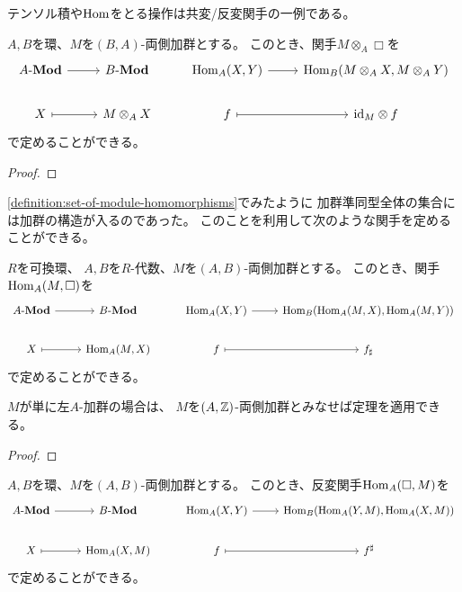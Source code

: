 \documentclass[report]{jlreq}
\begin{document}
テンソル積や$\operatorname{Hom}$をとる操作は共変/反変関手の一例である。

\begin{theorem}[テンソル関手]
    $A, B$を環、$M$を$(B, A)$-両側加群とする。
    このとき、関手$M \otimes_A \Box$を
    \begin{equation}
        \begin{tikzcd}
            \lMod{A} \ar{r}
                & \lMod{B}
                & \Hom_A(X, Y) \ar{r}
                & \Hom_B(M \otimes_A X, M \otimes_A Y) \\
            X \ar[mapsto]{r}
                & M \otimes_A X
                & f \ar[mapsto]{r}
                & \id_M \otimes f
        \end{tikzcd}
    \end{equation}
    で定めることができる。
\end{theorem}

\begin{proof}
    \TODO{}
\end{proof}

\cref{definition:set-of-module-homomorphisms}でみたように
加群準同型全体の集合には加群の構造が入るのであった。
このことを利用して次のような関手を定めることができる。

\begin{theorem}[共変ホム関手]
    $R$を可換環、
    $A, B$を$R$-代数、$M$を$(A, B)$-両側加群とする。
    このとき、関手$\operatorname{Hom}_A(M, \Box)$を
    \begin{equation}
        \begin{tikzcd}
            \lMod{A} \ar{r}
                & \lMod{B}
                & \Hom_A(X, Y) \ar{r}
                & \Hom_B(\Hom_A(M, X), \Hom_A(M, Y)) \\
            X \ar[mapsto]{r}
                & \Hom_A(M, X)
                & f \ar[mapsto]{r}
                & f_\sharp
        \end{tikzcd}
    \end{equation}
    で定めることができる。
\end{theorem}

\begin{remark}
    $M$が単に左$A$-加群の場合は、
    $M$を$(A, \mathbb{Z})$-両側加群とみなせば定理を適用できる。
\end{remark}

\begin{proof}
    \TODO{}
\end{proof}

\begin{theorem}[反変ホム関手]
    $A, B$を環、$M$を$(A, B)$-両側加群とする。
    このとき、反変関手$\operatorname{Hom}_A(\Box, M)$を
    \begin{equation}
        \begin{tikzcd}
            \lMod{A} \ar{r}
                & \lMod{B}
                & \Hom_A(X, Y) \ar{r}
                & \Hom_B(\Hom_A(Y, M), \Hom_A(X, M)) \\
            X \ar[mapsto]{r}
                & \Hom_A(X, M)
                & f \ar[mapsto]{r}
                & f^\sharp
        \end{tikzcd}
    \end{equation}
    で定めることができる。
\end{theorem}
\end{document}
